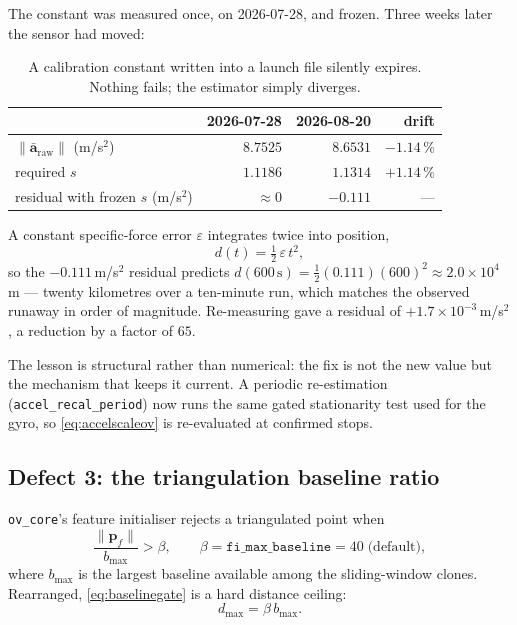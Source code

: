The constant was measured once, on 2026-07-28, and frozen. Three weeks later
the sensor had moved:

\begin{table}[htbp]
\centering
\begin{tabular}{@{}lrrr@{}}
\toprule
 & 2026-07-28 & 2026-08-20 & drift \\
\midrule
$\|\bar{\mathbf{a}}_{\mathrm{raw}}\|$ (m/s$^2$) & $8.7525$ & $8.6531$ & $-1.14\,\%$ \\
required $s$                                    & $1.1186$ & $1.1314$ & $+1.14\,\%$ \\
residual with frozen $s$ (m/s$^2$)              & $\approx 0$ & $-0.111$ & --- \\
\bottomrule
\end{tabular}
\caption[Accelerometer scale drift over three weeks]{A calibration constant
written into a launch file silently expires. Nothing fails; the estimator
simply diverges.}
\label{tab:accelexpire}
\end{table}

A constant specific-force error $\varepsilon$ integrates twice into position,
\begin{equation}
d(t) = \tfrac{1}{2}\,\varepsilon\,t^{2},
\label{eq:doubleintov}
\end{equation}
so the $-0.111$\,m/s$^2$ residual predicts
$d(600\,\mathrm{s}) = \tfrac{1}{2}(0.111)(600)^2 \approx 2.0\times10^{4}$\,m
--- twenty kilometres over a ten-minute run, which matches the observed
runaway in order of magnitude. Re-measuring gave a residual of
$+1.7\times10^{-3}$\,m/s$^2$, a reduction by a factor of $65$.

The lesson is structural rather than numerical: the fix is not the new value
but the mechanism that keeps it current. A periodic re-estimation
(\texttt{accel\_recal\_period}) now runs the same gated stationarity test used
for the gyro, so \eqref{eq:accelscaleov} is re-evaluated at confirmed stops.

\subsection{Defect 3: the triangulation baseline ratio}
\label{sec:baselineratio}

\texttt{ov\_core}'s feature initialiser rejects a triangulated point when
\begin{equation}
\frac{\|\mathbf{p}_f\|}{b_{\max}} > \beta,
\qquad \beta = \texttt{fi\_max\_baseline} = 40 \;\text{(default)},
\label{eq:baselinegate}
\end{equation}
where $b_{\max}$ is the largest baseline available among the sliding-window
clones. Rearranged, \eqref{eq:baselinegate} is a hard distance ceiling:
\begin{equation}
d_{\max} = \beta\, b_{\max}.
\label{eq:distceiling}
\end{equation}

